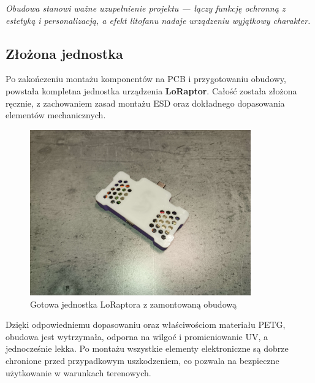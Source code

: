 \begin{tcolorbox}[
	colback=gray!5!white, 
	colframe=gray!75!black, 
	boxrule=0.8pt, 
	arc=5pt,
	enhanced,
	drop shadow,
	top=8pt,
	bottom=8pt,
	center
]
\textit{Obudowa stanowi ważne uzupełnienie projektu --- łączy funkcję ochronną z estetyką i personalizacją, a efekt litofanu nadaje urządzeniu wyjątkowy charakter.}
\end{tcolorbox}

\clearpage
\subsection{Złożona jednostka}

Po zakończeniu montażu komponentów na PCB i przygotowaniu obudowy, powstała kompletna jednostka urządzenia \textbf{LoRaptor}. Całość została złożona ręcznie, z zachowaniem zasad montażu ESD oraz dokładnego dopasowania elementów mechanicznych.

\begin{figure}[htbp]
\centering
	\includegraphics[width=0.85\textwidth]{root/finished_product.jpg}
	\caption{Gotowa jednostka LoRaptora z zamontowaną obudową}
\end{figure}

\clearpage

Dzięki odpowiedniemu dopasowaniu oraz właściwościom materiału PETG, obudowa jest wytrzymała, odporna na wilgoć i promieniowanie UV, a jednocześnie lekka. Po montażu wszystkie elementy elektroniczne są dobrze chronione przed przypadkowym uszkodzeniem, co pozwala na bezpieczne użytkowanie w warunkach terenowych.

